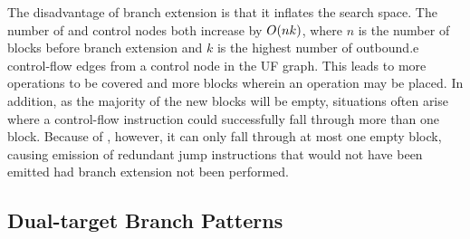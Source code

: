 The disadvantage of \gls{branch extension} is that it inflates the \gls{search
  space}.
%
The number of  and \glspl{control node} both increase by
$O(nk)$, where $n$ is the number of \glspl{block} before \gls{branch
  extension} and $k$ is the highest number of \gls{outbound.e}
\glspl{control-flow edge} from a \gls{control node} in the \gls{UF graph}.
%
This leads to more \glspl{operation} to be covered and more \glspl{block}
wherein an \gls{operation} may be placed.
%
In addition, as the majority of the new \glspl{block} will be empty, situations
often arise where a control-flow \gls{instruction} could successfully fall
through more than one \gls{block}.
%
Because of , however, it can only fall through at most
one empty \gls{block}, causing emission of redundant jump \glspl{instruction}
that would not have been emitted had \gls{branch extension} not been performed.


\subsection{Dual-target Branch Patterns}

\def\jmpPattern{p_{\textsc{jmp}}}%


